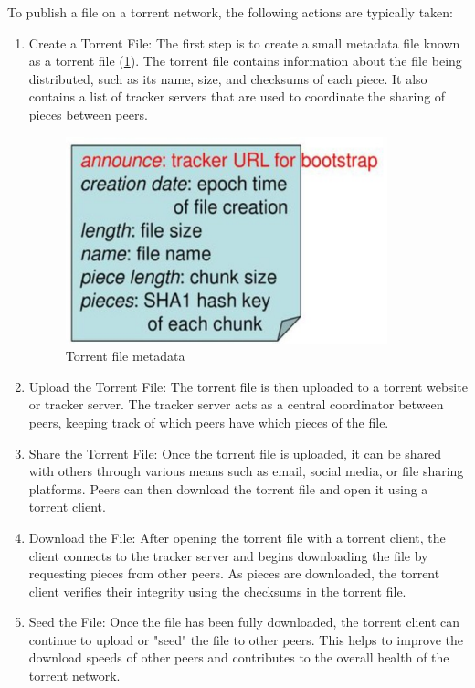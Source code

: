 \documentclass[10pt,a4paper]{report}
\begin{document}
To publish a file on a torrent network, the following actions are typically taken:
\begin{enumerate}
	\item 
	Create a Torrent File: The first step is to create a small metadata file known as a torrent file (\ref{bittorrent-metadata}). The torrent file contains information about the file being distributed, such as its name, size, and checksums of each piece. It also contains a list of tracker servers that are used to coordinate the sharing of pieces between peers.
	\begin{figure}[h!]
		\centering
		\includegraphics[scale=0.50]{images/Pasted image 20230311095142.png}
		\caption{Torrent file metadata}
		\label{bittorrent-metadata}
	\end{figure}
	
	\item 
	Upload the Torrent File: The torrent file is then uploaded to a torrent website or tracker server. The tracker server acts as a central coordinator between peers, keeping track of which peers have which pieces of the file.
	\item 
	Share the Torrent File: Once the torrent file is uploaded, it can be shared with others through various means such as email, social media, or file sharing platforms. Peers can then download the torrent file and open it using a torrent client.
	\item 
	Download the File: After opening the torrent file with a torrent client, the client connects to the tracker server and begins downloading the file by requesting pieces from other peers. As pieces are downloaded, the torrent client verifies their integrity using the checksums in the torrent file.
	\item 
	Seed the File: Once the file has been fully downloaded, the torrent client can continue to upload or "seed" the file to other peers. This helps to improve the download speeds of other peers and contributes to the overall health of the torrent network.
\end{enumerate}
\end{document}
